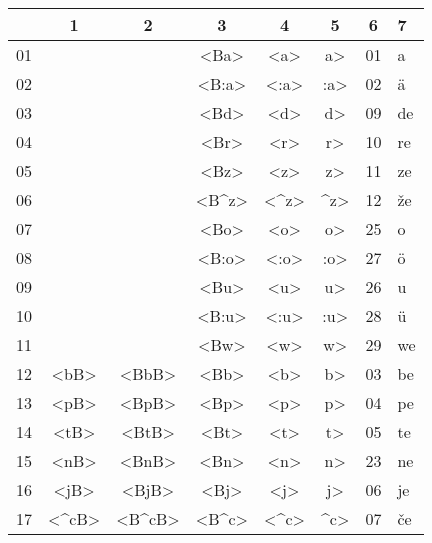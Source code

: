 \documentclass[12pt]{article}
\makeatletter
\def \({\a@verb}
\makeatother
\begin{document}
\parbox[t]{75mm}{%
\null
\begin{tabular}{|r|cccc@{ = }c@{ (}c@{)
 \vrule width0pt height13pt depth10pt}l|}
\hline
  & 1 	& 2 	& 3 	& 4 	& 5 	& 6  & 7 \\
\hline
01& 	& 	& <Ba>	& <a>	&\(a> 	& 01 & a \\
02& 	& 	& <B:a>	& <:a> 	&\(:a> 	& 02 & \"a \\
03& 	& 	& <Bd>	& <d> 	&\(d> 	& 09 & de \\
04& 	& 	& <Br>	& <r> 	&\(r> 	& 10 & re \\
05& 	& 	& <Bz>	& <z> 	&\(z> 	& 11 & ze \\
06& 	& 	& <B^z>	& <^z> 	&\(^z> 	& 12 & \v ze \\
07& 	& 	& <Bo>	& <o> 	&\(o> 	& 25 & o \\
08& 	& 	& <B:o>	& <:o> 	&\(:o> 	& 27 & \"o \\
09& 	& 	& <Bu>	& <u>	&\(u> 	& 26 & u \\
10& 	& 	& <B:u>	& <:u>	&\(:u> 	& 28 & \"u \\
11& 	& 	& <Bw>	& <w>	&\(w> 	& 29 & we \\
12&<bB>	&<BbB> 	& <Bb>	& <b>	&\(b> 	& 03 & be \\
13&<pB>	&<BpB> 	& <Bp>	& <p>	&\(p> 	& 04 & pe \\
14&<tB>	&<BtB> 	& <Bt>	& <t>	&\(t> 	& 05 & te \\
15&<nB>	&<BnB> 	& <Bn>	& <n>	&\(n> 	& 23 & ne \\
16&<jB>	&<BjB> 	& <Bj>	& <j>	&\(j> 	& 06 & je \\
17&<^cB>&<B^cB>	& <B^c>	& <^c>	&\(^c> 	& 07 & \v ce \\
\hline
\end{tabular}}\hfil
\end{document}
